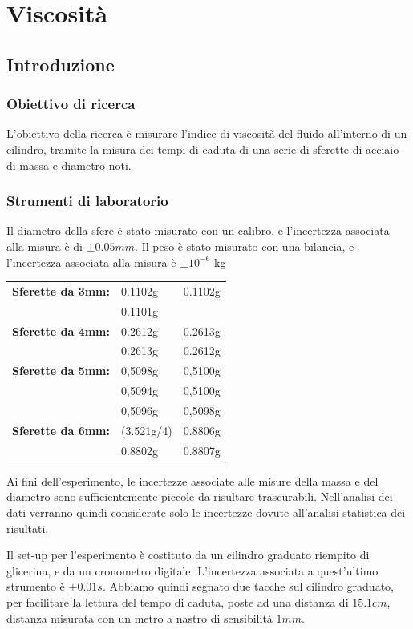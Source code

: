 \chapter{Viscosità}
\section{Introduzione}
\subsection{Obiettivo di ricerca}
L'obiettivo della ricerca è misurare l'indice di viscosità del fluido all'interno di un cilindro, tramite la misura dei tempi di caduta di una serie di sferette di acciaio di massa e diametro noti. 
\subsection{Strumenti di laboratorio}

Il diametro della sfere è stato misurato con un calibro, e l'incertezza associata alla misura è di $\pm0.05 mm$. Il peso è stato misurato con una bilancia, e l'incertezza associata alla misura è  $\pm10^{-6}$ kg

\begin{center}
\begin{tabular}{lll}
 \textbf{Sferette da 3mm:}
 & 0.1102g & 0.1102g \\
 & 0.1101g & \\
 \midrule
\textbf{Sferette da 4mm: }
 & 0.2612g & 0.2613g \\
 & 0.2613g & 0.2612g \\
 \midrule
\textbf{Sferette da 5mm: }
 & 0,5098g & 0,5100g \\
 & 0,5094g & 0,5100g \\
 & 0,5096g & 0,5098g \\
 \midrule
 \textbf{Sferette da 6mm:}
  & (3.521g/4) & 0.8806g \\
  & 0.8802g & 0.8807g \\
\end{tabular}
\end{center}
Ai fini dell'esperimento, le incertezze associate alle misure della massa e del diametro sono sufficientemente piccole da risultare trascurabili. Nell'analisi dei dati verranno quindi considerate solo le incertezze dovute all'analisi statistica dei risultati. 

Il set-up per l'esperimento è costituto da un cilindro graduato riempito di glicerina, e  da un cronometro digitale. L'incertezza associata a quest'ultimo strumento è $\pm0.01s$. Abbiamo quindi segnato due tacche sul cilindro graduato, per facilitare la lettura del tempo di caduta, poste ad una distanza di $15.1 cm$, distanza misurata con un metro a nastro di sensibilità $1mm$.

